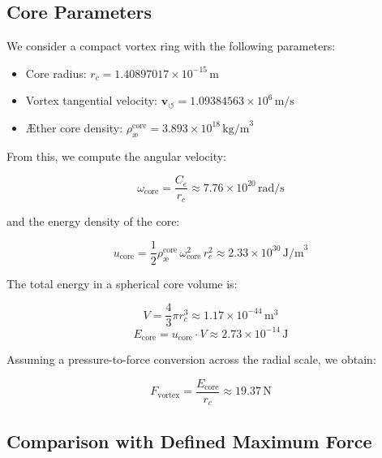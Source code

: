 \documentclass[preprint]{revtex4-2}
\begin{document}
\subsection{Core Parameters}

We consider a compact vortex ring with the following parameters:

\begin{itemize}
    \item Core radius: \( r_c = 1.40897017 \times 10^{-15} \, \text{m} \)
    \item Vortex tangential velocity: \( \mathbf{v}_{\scriptscriptstyle\boldsymbol{\circlearrowleft}} = 1.09384563 \times 10^{6} \, \text{m/s} \)
    \item Æther core density: \( \rho_\text{\ae}^\text{core} = 3.893 \times 10^{18} \, \text{kg/m}^3 \)
\end{itemize}

From this, we compute the angular velocity:

\begin{equation}
\omega_{\text{core}} = \frac{C_e}{r_c} \approx 7.76 \times 10^{20} \, \text{rad/s}
\end{equation}

and the energy density of the core:

\begin{equation}
u_{\text{core}} = \frac{1}{2} \rho_\text{\ae}^\text{core} \, \omega_{\text{core}}^2 \, r_c^2 \approx 2.33 \times 10^{30} \, \text{J/m}^3
\end{equation}

The total energy in a spherical core volume is:

\begin{equation}
V = \frac{4}{3} \pi r_c^3 \approx 1.17 \times 10^{-44} \, \text{m}^3
\end{equation}
\begin{equation}
E_{\text{core}} = u_{\text{core}} \cdot V \approx 2.73 \times 10^{-14} \, \text{J}
\end{equation}

Assuming a pressure-to-force conversion across the radial scale, we obtain:

\begin{equation}
F_{\text{vortex}} = \frac{E_{\text{core}}}{r_c} \approx 19.37 \, \text{N}
\end{equation}

\subsection{Comparison with Defined Maximum Force}
\end{document}
